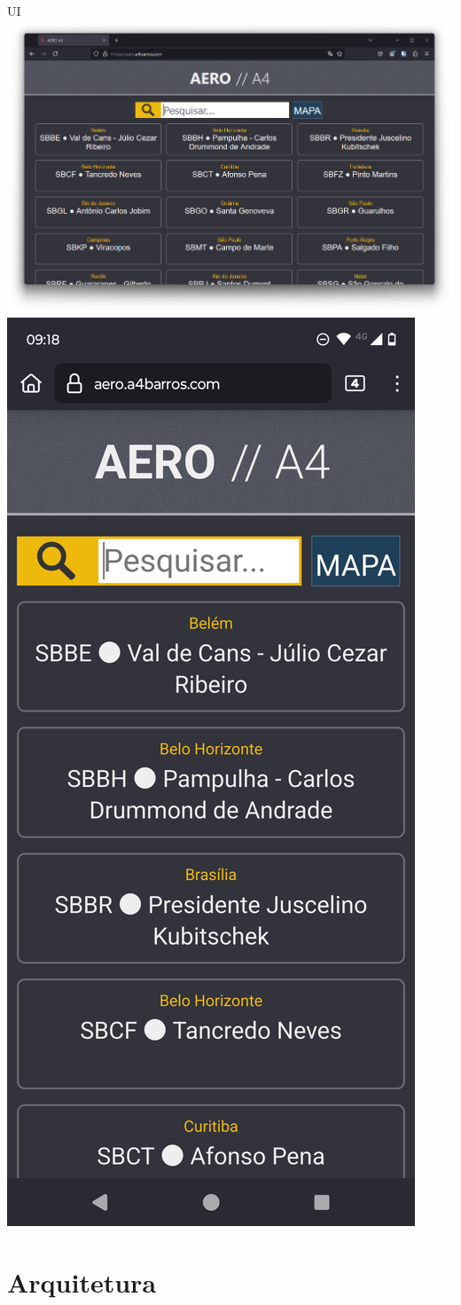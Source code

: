 \documentclass{beamer}
\begin{document}
\begin{frame}{UI}
    \includegraphics[width=0.7\linewidth]{img/UI.png}
    \includegraphics[width=0.2\linewidth]{img/UI_mobile.png}  
\end{frame}


\section{Arquitetura}
\end{document}
